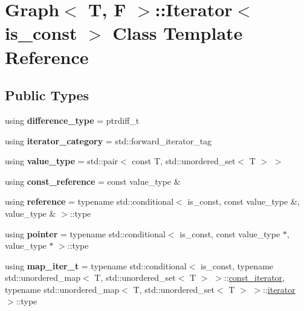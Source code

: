 \hypertarget{class_graph_1_1_iterator}{}\section{Graph$<$ T, F $>$\+:\+:Iterator$<$ is\+\_\+const $>$ Class Template Reference}
\label{class_graph_1_1_iterator}
\subsection*{Public Types}
\begin{DoxyCompactItemize}
\item 
\mbox{\label{class_graph_1_1_iterator_ae3c8aa9a5880ea3a2112aa885e38ed3a}} 
using {\bfseries difference\+\_\+type} = ptrdiff\+\_\+t
\item 
\mbox{\label{class_graph_1_1_iterator_a9074078e26bd4363babe918d85e6d072}} 
using {\bfseries iterator\+\_\+category} = std\+::forward\+\_\+iterator\+\_\+tag
\item 
\mbox{\label{class_graph_1_1_iterator_a31ffb49dc9edb9d625d0a5f754a53d78}} 
using {\bfseries value\+\_\+type} = std\+::pair$<$ const T, std\+::unordered\+\_\+set$<$ T $>$ $>$
\item 
\mbox{\label{class_graph_1_1_iterator_a6000611b4dbaaf9cca90947dd317f370}} 
using {\bfseries const\+\_\+reference} = const value\+\_\+type \&
\item 
\mbox{\label{class_graph_1_1_iterator_a14d814930d836c727ad2e150eb412b09}} 
using {\bfseries reference} = typename std\+::conditional$<$ is\+\_\+const, const value\+\_\+type \&, value\+\_\+type \& $>$\+::type
\item 
\mbox{\label{class_graph_1_1_iterator_a55e433f15b2a3941c86224f85922b965}} 
using {\bfseries pointer} = typename std\+::conditional$<$ is\+\_\+const, const value\+\_\+type $\ast$, value\+\_\+type $\ast$ $>$\+::type
\item 
\mbox{\label{class_graph_1_1_iterator_ab67e162bfdadd3b49c3e7873d0960867}} 
using {\bfseries map\+\_\+iter\+\_\+t} = typename std\+::conditional$<$ is\+\_\+const, typename std\+::unordered\+\_\+map$<$ T, std\+::unordered\+\_\+set$<$ T $>$ $>$\+::\hyperlink{class_graph_1_1_iterator}{const\+\_\+iterator}, typename std\+::unordered\+\_\+map$<$ T, std\+::unordered\+\_\+set$<$ T $>$ $>$\+::\hyperlink{class_graph_1_1_iterator}{iterator} $>$\+::type
\end{DoxyCompactItemize}
